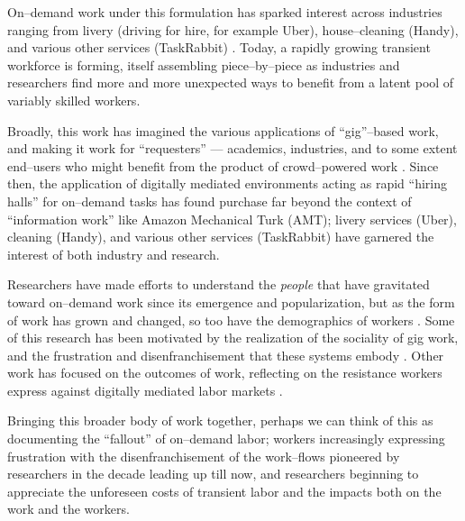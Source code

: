 \documentclass[trackingWork]{subfiles}
\begin{document}

On--demand work under this formulation
has sparked interest across industries ranging from
livery (driving for hire, for example Uber),
house--cleaning (Handy),
and various other services (TaskRabbit)
\cite{uberOfficial,zaarlyOfficial,taskrabbitOfficial}.
Today, a rapidly growing transient workforce is forming,
itself assembling piece--by--piece as industries and researchers find more and more unexpected ways
to benefit from a latent pool of variably skilled workers.



Broadly, this work has imagined the various applications of ``gig''--based work,
and making it work for ``requesters''
--- academics, industries, and to some extent end--users
who might benefit from the product of crowd--powered work
\cite{hong2015group,jonBrelig,paolacci2010running}.
Since then,
the application of digitally mediated environments acting as rapid ``hiring halls''
for on--demand tasks
has found purchase far beyond the context of ``information work'' like Amazon Mechanical Turk (AMT);
livery services (Uber), cleaning (Handy), and various other services (TaskRabbit)
have garnered the interest of both industry and research.

Researchers have made efforts to understand the \textit{people} that have gravitated toward on--demand work
since its emergence and popularization,
but as the form of work has grown and changed, so too have the demographics of workers
\cite{Ross,whoareNOTtheTurkers}.
Some of this research has been motivated by the realization of the sociality of gig work,
and the frustration and disenfranchisement that these systems embody
\cite{turkopticon,dynamo}.
Other work has focused on the outcomes of work,
reflecting on the resistance workers express against digitally mediated labor markets
\cite{uberAlgorithm}.

Bringing this broader body of work together, perhaps we can think of this as documenting the ``fallout'' of on--demand labor;
workers increasingly expressing frustration with the disenfranchisement of the work--flows pioneered by researchers in the decade leading up till now,
and researchers beginning to appreciate the unforeseen costs of transient labor and the impacts both on the work and the workers.

\end{document}
